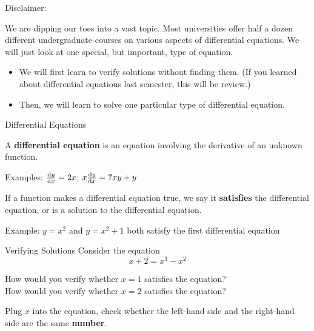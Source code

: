 \begin{frame}
\label{note2.4a}
\centering
Disclaimer:

We are dipping our toes into a vast topic. Most universities offer half a dozen different undergraduate
courses on various aspects of differential equations. We will just look
at one special, but important, type of equation.
\vfill

\begin{itemize}[<+->]
\item We will first learn to \alert{verify} solutions without \alert{finding} them. (If you learned about differential equations last semester, this will be review.)\vfill
\item \alert{Then,} we will learn to solve one particular type of differential equation.\vfill

\end{itemize}
\vfill

\end{frame}
\begin{frame}{Differential Equations}
\begin{defn}
	A \textbf{differential equation} is an equation involving the derivative of an unknown function.
	\end{defn}
\pause \vfill
Examples: $\frac{\text{d}y}{\text{d}x}=2x$; \qquad $x\frac{\text{d}y}{\text{d}x}=7xy+y$
\pause \vfill
\begin{defn}
	If a \alert{function} makes a differential equation true, we say it \textbf{satisfies} the differential equation, or is a solution to the differential equation.
\end{defn}
\pause\vfill
Example: $y=x^2$ and $y=x^2+1$ both satisfy the first differential equation%
\end{frame}

\begin{frame}[t]{Verifying Solutions}
\AnswerNo
Consider the equation 
\[x+2=x^3-x^2\]

How would you verify whether $x=1$ satisfies the equation?\\


How would you verify whether $x=2$ satisfies the equation?\\
\pause

\color{W1} Plug $x$ into the equation, check whether the left-hand side and the right-hand side are the same \textbf{number}.
\end{frame}

